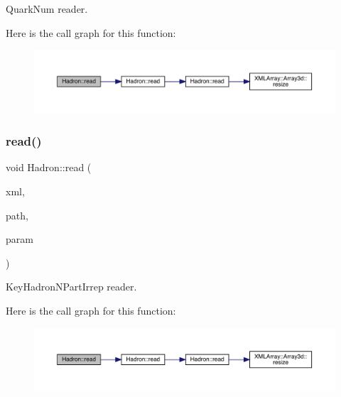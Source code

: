 Quark\+Num reader. 

Here is the call graph for this function\+:
\nopagebreak
\begin{figure}[H]
\begin{center}
\leavevmode
\includegraphics[width=350pt]{d1/daf/namespaceHadron_a9fc0b61edf5216d1720dabf68810d3b5_cgraph}
\end{center}
\end{figure}
\mbox{\label{namespaceHadron_a9e39323c40f07b97b83923c9bfd452b3}} 
\subsubsection{\texorpdfstring{read()}{read()}\hspace{0.1cm}{\footnotesize\ttfamily [8/94]}}
{\footnotesize\ttfamily void Hadron\+::read (\begin{DoxyParamCaption}\item[{\mbox{\hyperlink{classADATXML_1_1XMLReader}{X\+M\+L\+Reader}} \&}]{xml,  }\item[{const std\+::string \&}]{path,  }\item[{\mbox{\hyperlink{structHadron_1_1KeyHadronNPartIrrep__t}{Key\+Hadron\+N\+Part\+Irrep\+\_\+t}} \&}]{param }\end{DoxyParamCaption})}



Key\+Hadron\+N\+Part\+Irrep reader. 

Here is the call graph for this function\+:
\nopagebreak
\begin{figure}[H]
\begin{center}
\leavevmode
\includegraphics[width=350pt]{d1/daf/namespaceHadron_a9e39323c40f07b97b83923c9bfd452b3_cgraph}
\end{center}
\end{figure}
\mbox{\label{namespaceHadron_af29a7ca56e3472207899938a2a50babe}} 
